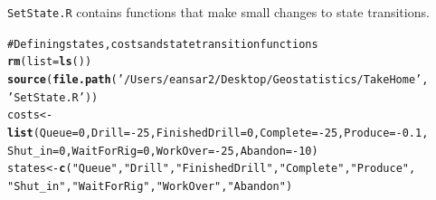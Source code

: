 \documentclass[paper=a4, fontsize=12pt]{scrartcl}\usepackage{graphicx, color}
\makeatletter
\newcommand{\hlfunctioncall}[1]{\textcolor[rgb]{0.501960784313725,0,0.329411764705882}{\textbf{#1}}}%
\newcommand{\hlstring}[1]{\textcolor[rgb]{0.6,0.6,1}{#1}}%
\newcommand{\hlcomment}[1]{\textcolor[rgb]{0.180392156862745,0.6,0.341176470588235}{#1}}%
\newenvironment{kframe}{%
 \def\at@end@of@kframe{}%
 \ifinner\ifhmode%
  \def\at@end@of@kframe{\end{minipage}}%
  \begin{minipage}{\columnwidth}%
 \fi\fi%
 \def\FrameCommand##1{\hskip\@totalleftmargin \hskip-\fboxsep
 \colorbox{shadecolor}{##1}\hskip-\fboxsep
     \hskip-\linewidth \hskip-\@totalleftmargin \hskip\columnwidth}%
 \MakeFramed {\advance\hsize-\width
   \@totalleftmargin\z@ \linewidth\hsize
   \@setminipage}}%
 {\par\unskip\endMakeFramed%
 \at@end@of@kframe}
\newenvironment{knitrout}{}{} %
\numberwithin{equation}{section} %
\numberwithin{figure}{section} %
\numberwithin{table}{section} %
\makeatother
\begin{document}
\texttt{SetState.R} contains functions that make small changes to state transitions. 
\begin{knitrout}
\color{fgcolor}\begin{kframe}
\begin{alltt}
\hlcomment{#Defining states, costs and state transition functions}
\hlfunctioncall{rm}(list=\hlfunctioncall{ls}())
\hlfunctioncall{source}(\hlfunctioncall{file.path}(\hlstring{'/Users/eansar2/Desktop/Geostatistics/TakeHome'},
                 \hlstring{'SetState.R'}))
costs <- \hlfunctioncall{list}(Queue=0,Drill=-25,FinishedDrill=0,Complete=-25,Produce=-0.1,
              Shut_in=0,WaitForRig=0,WorkOver=-25,Abandon=-10)
states <-   \hlfunctioncall{c}(\hlstring{"Queue"},\hlstring{"Drill"},\hlstring{"FinishedDrill"},\hlstring{"Complete"},\hlstring{"Produce"},
              \hlstring{"Shut_in"},\hlstring{"WaitForRig"},\hlstring{"WorkOver"},\hlstring{"Abandon"})

\end{alltt}
\end{kframe}
\end{knitrout}
\end{document}
